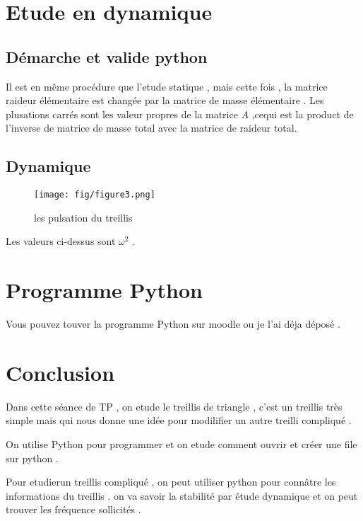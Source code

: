 \documentclass[a4paper,10pt]{report} %
\begin{document}
\chapter{Etude en dynamique}
\section{Démarche et valide python}
Il est en même procédure que l'etude statique , mais cette fois , la matrice raideur élémentaire  est changée par la matrice de masse élémentaire .  Les plusations carrés sont les valeur propres de la matrice $A$ ,cequi est la product de l'inverse de matrice de masse total avec la matrice de raideur total.  

\section{Dynamique}

\begin{figure}[h]
\centering
\texttt{[image: fig/figure3.png]}
\caption{les pulsation du treillis}
\end{figure}
 Les valeurs ci-dessus sont $\omega^2$ .


\chapter{Programme Python}
Vous pouvez touver la programme Python sur moodle ou je l'ai déja déposé .%
\chapter{Conclusion}

Dans cette séance de TP , on etude le treillis de triangle , c'est un treillis très simple mais qui nous donne une idée pour modilifier un autre treilli compliqué . 

On utilise Python pour programmer et on etude comment ouvrir et créer une file sur python .

Pour etudierun  treillis compliqué , on peut utiliser python pour connâtre les informations du treillis . on va savoir la stabilité par étude dynamique et on peut trouver les fréquence sollicités . 







	
\end{document}
